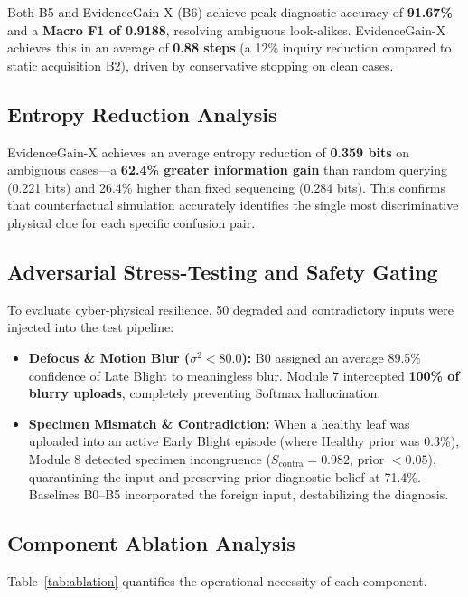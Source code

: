\documentclass[conference]{IEEEtran}
\begin{document}
Both B5 and EvidenceGain-X (B6) achieve peak diagnostic accuracy of \textbf{91.67\%} and a \textbf{Macro F1 of 0.9188}, resolving ambiguous look-alikes. EvidenceGain-X achieves this in an average of \textbf{0.88 steps} (a 12\% inquiry reduction compared to static acquisition B2), driven by conservative stopping on clean cases.

\subsection{Entropy Reduction Analysis}
EvidenceGain-X achieves an average entropy reduction of \textbf{0.359 bits} on ambiguous cases---a \textbf{62.4\% greater information gain} than random querying (0.221 bits) and 26.4\% higher than fixed sequencing (0.284 bits). This confirms that counterfactual simulation accurately identifies the single most discriminative physical clue for each specific confusion pair.

\subsection{Adversarial Stress-Testing and Safety Gating}
To evaluate cyber-physical resilience, 50 degraded and contradictory inputs were injected into the test pipeline:
\begin{itemize}
    \item \textbf{Defocus \& Motion Blur ($\sigma^2 < 80.0$):} B0 assigned an average 89.5\% confidence of Late Blight to meaningless blur. Module 7 intercepted \textbf{100\% of blurry uploads}, completely preventing Softmax hallucination.
    \item \textbf{Specimen Mismatch \& Contradiction:} When a healthy leaf was uploaded into an active Early Blight episode (where Healthy prior was 0.3\%), Module 8 detected specimen incongruence ($S_{\text{contra}} = 0.982$, prior $< 0.05$), quarantining the input and preserving prior diagnostic belief at 71.4\%. Baselines B0--B5 incorporated the foreign input, destabilizing the diagnosis.
\end{itemize}

\subsection{Component Ablation Analysis}
Table~\ref{tab:ablation} quantifies the operational necessity of each component.
\end{document}
